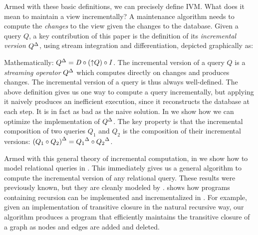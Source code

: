 Armed with these basic definitions, we can precisely define IVM.  What
does it mean to maintain a view incrementally?  A maintenance
algorithm needs to compute the \emph{changes} to the view given the
changes to the database. Given a query $Q$, a key contribution of this
paper is the definition of its \emph{incremental version} ${Q}^{\Delta}$,
using stream integration and differentiation, depicted graphically as:
\vspace{-1ex}
%
\begin{center}
\end{center}
\vspace{-1ex}
%
Mathematically: ${Q}^{\Delta} = \mathit{D} \circ ({\uparrow}Q) \circ \mathit{I}$.  The
incremental version of a query $Q$ is a \emph{streaming operator}
${Q}^{\Delta}$ which computes directly on changes and produces changes.
The incremental version of a query is thus always well-defined.  The
above definition gives us one way to compute a query incrementally,
but applying it naively produces an inefficient execution, since it
reconstructs the database at each step.  It is in fact as bad as the
naive solution.  In  we show how we can
optimize the implementation of ${Q}^{\Delta}$. The key property is that the
incremental composition of two queries $Q_1$ and $Q_2$ is the
composition of their incremental versions: ${(Q_1 \circ Q_2)}^{\Delta} =
{Q_1}^{\Delta} \circ {Q_2}^{\Delta}$.

Armed with this general theory of incremental computation, in
 we show how to model relational queries in
\dbsp.  This immediately gives us a general algorithm to compute the
incremental version of any relational query.  These results were
previously known, but they are cleanly modeled by \dbsp.
 shows how programs containing recursion can be
implemented and incrementalized in \dbsp.  For example, given an
implementation of transitive closure in the natural recursive way, our
algorithm produces a program that efficiently maintains the transitive
closure of a graph as nodes and edges are added and deleted.

